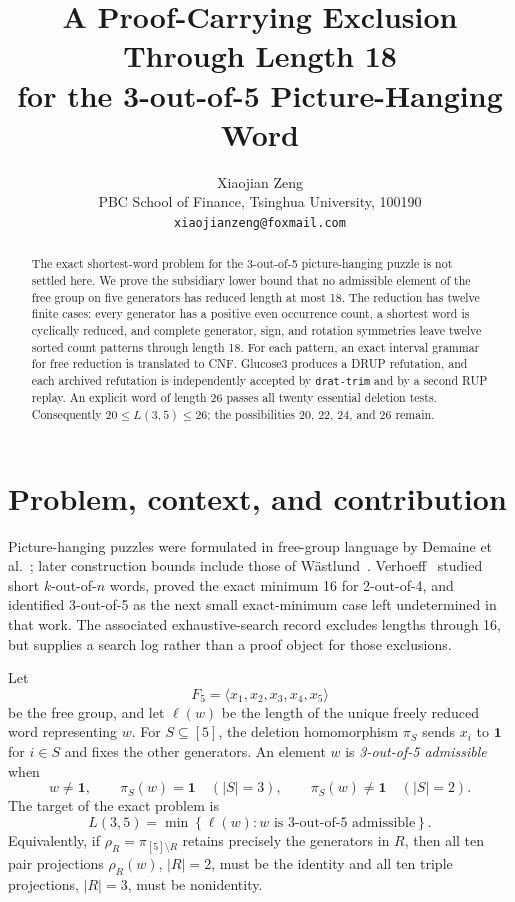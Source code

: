 \documentclass[11pt]{article}
\title{A Proof-Carrying Exclusion Through Length 18\\
for the 3-out-of-5 Picture-Hanging Word}
\author{Xiaojian Zeng\\
PBC School of Finance, Tsinghua University, 100190\\
\texttt{xiaojianzeng@foxmail.com}}
\date{}
\begin{document}
\maketitle

\begin{abstract}
The exact shortest-word problem for the 3-out-of-5 picture-hanging puzzle is
not settled here.  We prove the subsidiary lower bound that no admissible
element of the free group on five generators has reduced length at most 18.
The reduction has twelve finite cases: every generator has a positive even
occurrence count, a shortest word is cyclically reduced, and complete
generator, sign, and rotation symmetries leave twelve sorted count patterns
through length 18.  For each pattern, an exact interval grammar for free
reduction is translated to CNF.  Glucose3 produces a DRUP refutation, and
each archived refutation is independently accepted by \texttt{drat-trim} and
by a second RUP replay.  An explicit word of length 26 passes all twenty
essential deletion tests.  Consequently \(20\leq L(3,5)\leq 26\); the
possibilities 20, 22, 24, and 26 remain.
\end{abstract}

\section{Problem, context, and contribution}

Picture-hanging puzzles were formulated in free-group language by Demaine
et al.~\cite{DemaineEtAl2014}; later construction bounds include those of
W\"astlund~\cite{Wastlund2021}.  Verhoeff~\cite{Verhoeff2026} studied short
\(k\)-out-of-\(n\) words, proved the exact minimum 16 for 2-out-of-4, and
identified 3-out-of-5 as the next small exact-minimum case left undetermined
in that work.  The associated exhaustive-search record excludes lengths
through 16, but supplies a search log rather than a proof object for those
exclusions.

Let
\[
 F_5=\langle x_1,x_2,x_3,x_4,x_5\rangle
\]
be the free group, and let \(\ell(w)\) be the length of the unique freely
reduced word representing \(w\).  For \(S\subseteq[5]\), the deletion
homomorphism \(\pi_S\) sends \(x_i\) to \(\mathbf{1}\) for \(i\in S\) and fixes the
other generators.  An element \(w\) is \emph{3-out-of-5 admissible} when
\[
 w\ne\mathbf{1},\qquad
 \pi_S(w)=\mathbf{1}\quad(|S|=3),\qquad
 \pi_S(w)\ne\mathbf{1}\quad(|S|=2).
\]
The target of the exact problem is
\[
 L(3,5)=\min\left\{\ell(w):w\text{ is 3-out-of-5 admissible}\right\}.
\]
Equivalently, if \(\rho_R=\pi_{[5]\setminus R}\) retains precisely the
generators in \(R\), then all ten pair projections \(\rho_R(w)\),
\(|R|=2\), must be the identity and all ten triple projections, \(|R|=3\),
must be nonidentity.
\end{document}
